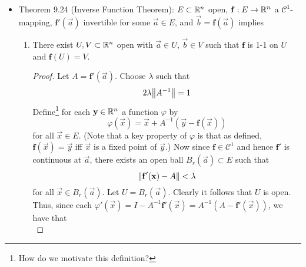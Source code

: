 \documentclass[../notes.tex]{subfiles}
\begin{document}
\begin{itemize}
\begin{proof}
\begin{equation*}
            \varphi(x) = \lim_{n\to\infty}\varphi(x_n)
            = \lim_{n\to\infty}x_{n+1}
            = x
        \end{equation*}
        as desired.\par
        Now suppose for the sake of contradiction that there exists $y\neq x$ such that $\varphi(y)=y$. Then since $\varphi$ is a contraction,
        \begin{equation*}
            d(y,x) = d(\varphi(y),\varphi(x)) \leq c\cdot d(y,x) < d(y,x)
        \end{equation*}
        a contradiction.
    \end{proof}
    \item Theorem 9.24 (Inverse Function Theorem): $E\subset\mathbb{R}^n$ open, $\mathbf{f}:E\to\mathbb{R}^n$ a $\mathscr{C}^1$-mapping, $\mathbf{f}'(\vec{a})$ invertible for some $\vec{a}\in E$, and $\vec{b}=\mathbf{f}(\vec{a})$ implies
    \begin{enumerate}[label={(\alph*)}]
        \item There exist $U,V\subset\mathbb{R}^n$ open with $\vec{a}\in U$, $\vec{b}\in V$ such that $\mathbf{f}$ is 1-1 on $U$ and $\mathbf{f}(U)=V$.
        \begin{proof}
            Let $A=\mathbf{f}'(\vec{a})$. Choose $\lambda$ such that
            \begin{equation*}
                2\lambda\norm{A^{-1}} = 1
            \end{equation*}
            Define\footnote{How do we motivate this definition?} for each $\mathbf{y}\in\mathbb{R}^n$ a function $\varphi$ by
            \begin{equation*}
                \varphi(\vec{x}) = \vec{x}+A^{-1}(\vec{y}-\mathbf{f}(\vec{x}))
            \end{equation*}
            for all $\vec{x}\in E$. (Note that a key property of $\varphi$ is that as defined, $\mathbf{f}(\vec{x})=\vec{y}$ iff $\vec{x}$ is a fixed point of $\vec{y}$.) Now since $\mathbf{f}\in\mathscr{C}^1$ and hence $\mathbf{f}'$ is continuous at $\vec{a}$, there exists an open ball $B_r(\vec{a})\subset E$ such that
            \begin{equation*}
                \norm{\mathbf{f}'(\mathbf{x})-A} < \lambda
            \end{equation*}
            for all $\vec{x}\in B_r(\vec{a})$. Let $U=B_r(\vec{a})$. Clearly it follows that $U$ is open. Thus, since each $\varphi'(\vec{x})=I-A^{-1}\mathbf{f}'(\vec{x})=A^{-1}(A-\mathbf{f}'(\vec{x}))$, we have that
            \begin{equation*}

\end{equation*}
\end{proof}
\end{enumerate}
\end{itemize}
\end{document}
